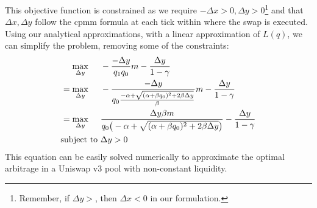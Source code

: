 \documentclass[11pt]{article}
\begin{document}
This objective function is constrained as we require $-\Delta x > 0, \Delta y > 0$\footnote{Remember, if $\Delta y >$, then $\Delta x < 0$ in our formulation.} and that $\Delta x, \Delta y$ follow the \gls{cpmm} formula at each tick within where the swap is executed. Using our analytical approximations, with a linear approximation of $L(q)$, we can simplify the problem, removing some of the constraints:
\begin{align} \label{eq:21}
    \max_{\Delta y} \hspace{0.5cm} &-\frac{-\Delta y}{q_1 q_0} m - \frac{\Delta y}{1 - \gamma} \nonumber \\
    = \max_{\Delta y} \hspace{0.5cm} &-\frac{-\Delta y}{q_0 \frac{-\alpha + \sqrt{(\alpha + \beta q_0)^2 + 2 \beta \Delta y}}{\beta}} m - \frac{\Delta y}{1 - \gamma} \nonumber \\
    = \max_{\Delta y} \hspace{0.5cm} &\frac{\Delta y \beta m}{q_0 \big (-\alpha + \sqrt{(\alpha + \beta q_0)^2 + 2 \beta \Delta y} \big)} - \frac{\Delta y}{1 - \gamma} \\
    \text{subject to } & \Delta y > 0 \nonumber
\end{align}
This equation can be easily solved numerically to approximate the optimal arbitrage in a Uniswap v3 pool with non-constant liquidity.
\end{document}
